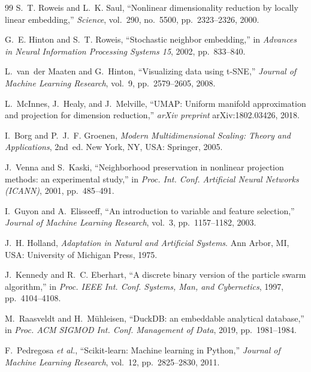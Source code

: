\documentclass[conference]{IEEEtran}
\begin{document}
\begin{thebibliography}{99}
S.~T. Roweis and L.~K. Saul, ``Nonlinear dimensionality reduction by locally linear embedding,'' \emph{Science}, vol.~290, no.~5500, pp.~2323--2326, 2000.

G.~E. Hinton and S.~T. Roweis, ``Stochastic neighbor embedding,'' in \emph{Advances in Neural Information Processing Systems 15}, 2002, pp.~833--840.

L.~van~der Maaten and G.~Hinton, ``Visualizing data using t-SNE,'' \emph{Journal of Machine Learning Research}, vol.~9, pp.~2579--2605, 2008.

L.~McInnes, J.~Healy, and J.~Melville, ``UMAP: Uniform manifold approximation and projection for dimension reduction,'' \emph{arXiv preprint} arXiv:1802.03426, 2018.

I.~Borg and P.~J.~F. Groenen, \emph{Modern Multidimensional Scaling: Theory and Applications}, 2nd~ed. New York, NY, USA: Springer, 2005.

J.~Venna and S.~Kaski, ``Neighborhood preservation in nonlinear projection methods: an experimental study,'' in \emph{Proc. Int. Conf. Artificial Neural Networks (ICANN)}, 2001, pp.~485--491.

I.~Guyon and A.~Elisseeff, ``An introduction to variable and feature selection,'' \emph{Journal of Machine Learning Research}, vol.~3, pp.~1157--1182, 2003.

J.~H. Holland, \emph{Adaptation in Natural and Artificial Systems}. Ann Arbor, MI, USA: University of Michigan Press, 1975.

J.~Kennedy and R.~C. Eberhart, ``A discrete binary version of the particle swarm algorithm,'' in \emph{Proc. IEEE Int. Conf. Systems, Man, and Cybernetics}, 1997, pp.~4104--4108.

M.~Raasveldt and H.~M\"uhleisen, ``DuckDB: an embeddable analytical database,'' in \emph{Proc. ACM SIGMOD Int. Conf. Management of Data}, 2019, pp.~1981--1984.

F.~Pedregosa \emph{et al.}, ``Scikit-learn: Machine learning in Python,'' \emph{Journal of Machine Learning Research}, vol.~12, pp.~2825--2830, 2011.

\end{thebibliography}
\end{document}
